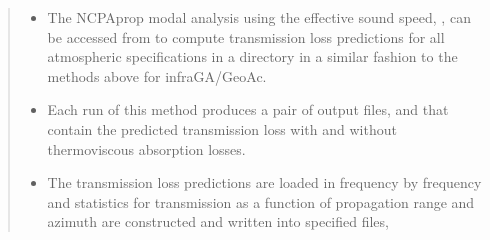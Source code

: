 \documentclass[letterpaper,10pt,english]{sphinxmanual}
\begin{document}
\begin{itemize}
\begin{quote}
\begin{itemize}
\item {} 
\sphinxAtStartPar
The NCPAprop modal analysis using the effective sound speed, , can be accessed from  to compute transmission loss predictions for all atmospheric specifications in a directory in a similar fashion to the methods above for infraGA/GeoAc.

\end{itemize}

\begin{sphinxVerbatim}[commandchars=\\\{\}]
   

      
    

   
         
\end{sphinxVerbatim}
\begin{itemize}
\item {} 
\sphinxAtStartPar
Each run of this method produces a pair of output files,  and  that contain the predicted transmission loss with and without thermo\sphinxhyphen{}viscous absorption losses.

\item {} 
\sphinxAtStartPar
The transmission loss predictions are loaded in frequency by frequency and statistics for transmission as a function of propagation range and azimuth are constructed and written into specified files,


\end{itemize}
\end{quote}
\end{itemize}
\end{document}
